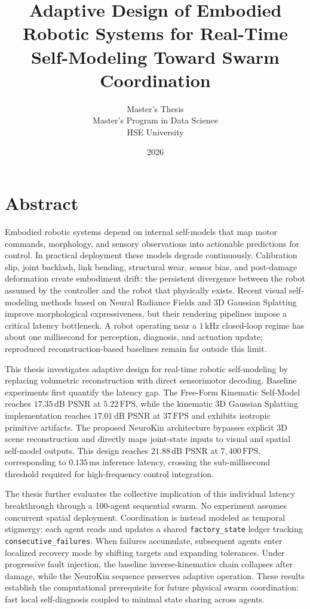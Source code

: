 \documentclass[12pt,a4paper,oneside]{report}
\title{\textbf{Adaptive Design of Embodied Robotic Systems for Real-Time Self-Modeling Toward Swarm Coordination}}
\author{Master's Thesis\\Master's Program in Data Science\\HSE University}
\date{2026}
\begin{document}
\maketitle
\clearpage
{}

\chapter*{Abstract}

Embodied robotic systems depend on internal self-models that map motor commands, morphology, and sensory observations into actionable predictions for control. In practical deployment these models degrade continuously. Calibration slip, joint backlash, link bending, structural wear, sensor bias, and post-damage deformation create embodiment drift: the persistent divergence between the robot assumed by the controller and the robot that physically exists. Recent visual self-modeling methods based on Neural Radiance Fields and 3D Gaussian Splatting improve morphological expressiveness, but their rendering pipelines impose a critical latency bottleneck. A robot operating near a $1\,\mathrm{kHz}$ closed-loop regime has about one millisecond for perception, diagnosis, and actuation update; reproduced reconstruction-based baselines remain far outside this limit.

This thesis investigates adaptive design for real-time robotic self-modeling by replacing volumetric reconstruction with direct sensorimotor decoding. Baseline experiments first quantify the latency gap. The Free-Form Kinematic Self-Model reaches $17.35\,\mathrm{dB}$ PSNR at $5.22\,\mathrm{FPS}$, while the kinematic 3D Gaussian Splatting implementation reaches $17.01\,\mathrm{dB}$ PSNR at $37\,\mathrm{FPS}$ and exhibits isotropic primitive artifacts. The proposed NeuroKin architecture bypasses explicit 3D scene reconstruction and directly maps joint-state inputs to visual and spatial self-model outputs. This design reaches $21.88\,\mathrm{dB}$ PSNR at $7{,}400\,\mathrm{FPS}$, corresponding to $0.135\,\mathrm{ms}$ inference latency, crossing the sub-millisecond threshold required for high-frequency control integration.

The thesis further evaluates the collective implication of this individual latency breakthrough through a 100-agent sequential swarm. No experiment assumes concurrent spatial deployment. Coordination is instead modeled as temporal stigmergy: each agent reads and updates a shared \texttt{factory\_state} ledger tracking \texttt{consecutive\_failures}. When failures accumulate, subsequent agents enter localized recovery mode by shifting targets and expanding tolerances. Under progressive fault injection, the baseline inverse-kinematics chain collapses after damage, while the NeuroKin sequence preserves adaptive operation. These results establish the computational prerequisite for future physical swarm coordination: fast local self-diagnosis coupled to minimal state sharing across agents.
\end{document}
